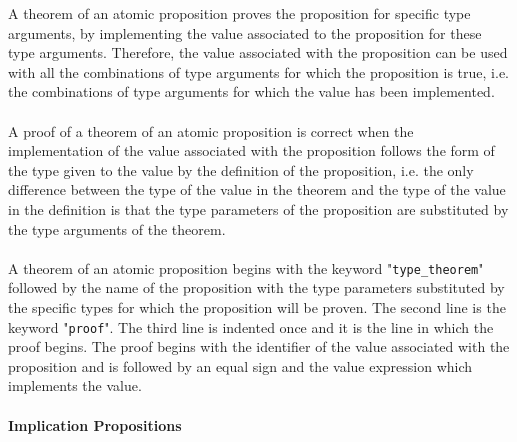 \documentclass{article}
\begin{document}
\begin{itemize}
A theorem of an atomic proposition proves the proposition for
specific type arguments, by implementing the value associated to the
proposition for these type arguments. Therefore, the value associated with the
proposition can be used with all the combinations of type arguments for which
the proposition is true, i.e. the combinations of type arguments for which
the value has been implemented.
\\\\
A proof of a theorem of an atomic proposition is correct when the
implementation of the value associated with the proposition follows the form of
the type given to the value by the definition of the proposition, i.e. the only
difference between the type of the value in the theorem and the type of the
value in the definition is that the type parameters of the proposition are
substituted by the type arguments of the theorem.
\\\\
A theorem of an atomic proposition begins with the keyword
"\verb|type_theorem|" followed by the name of the proposition with the type
parameters substituted by the specific types for which the proposition will be
proven. The second line is the keyword "\verb|proof|". The third line is
indented once and it is the line in which the proof begins. The proof begins
with the identifier of the value associated with the proposition and is
followed by an equal sign and the value expression which implements the value.

\end{itemize}

\newpage

\paragraph{Implication Propositions}
\end{document}
